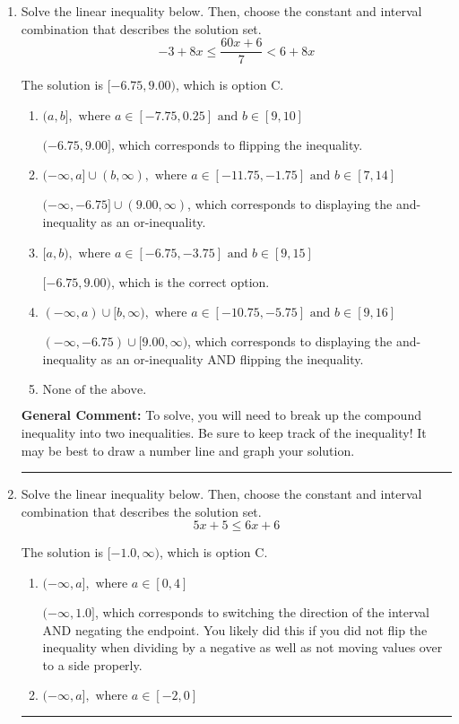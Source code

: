 \documentclass{extbook}[14pt]
\newcommand{\litem}[1]{\item #1

\rule{\textwidth}{0.4pt}}
\begin{document}
\begin{enumerate}\litem{
Solve the linear inequality below. Then, choose the constant and interval combination that describes the solution set.
\[ -3 + 8 x \leq \frac{60 x + 6}{7} < 6 + 8 x \]

The solution is \( [-6.75, 9.00) \), which is option C.\begin{enumerate}[label=\Alph*.]
\item \( (a, b], \text{ where } a \in [-7.75, 0.25] \text{ and } b \in [9, 10] \)

$(-6.75, 9.00]$, which corresponds to flipping the inequality.
\item \( (-\infty, a] \cup (b, \infty), \text{ where } a \in [-11.75, -1.75] \text{ and } b \in [7, 14] \)

$(-\infty, -6.75] \cup (9.00, \infty)$, which corresponds to displaying the and-inequality as an or-inequality.
\item \( [a, b), \text{ where } a \in [-6.75, -3.75] \text{ and } b \in [9, 15] \)

$[-6.75, 9.00)$, which is the correct option.
\item \( (-\infty, a) \cup [b, \infty), \text{ where } a \in [-10.75, -5.75] \text{ and } b \in [9, 16] \)

$(-\infty, -6.75) \cup [9.00, \infty)$, which corresponds to displaying the and-inequality as an or-inequality AND flipping the inequality.
\item \( \text{None of the above.} \)


\end{enumerate}

\textbf{General Comment:} To solve, you will need to break up the compound inequality into two inequalities. Be sure to keep track of the inequality! It may be best to draw a number line and graph your solution.
}
\litem{
Solve the linear inequality below. Then, choose the constant and interval combination that describes the solution set.
\[ 5x + 5 \leq 6x + 6 \]

The solution is \( [-1.0, \infty) \), which is option C.\begin{enumerate}[label=\Alph*.]
\item \( (-\infty, a], \text{ where } a \in [0, 4] \)

 $(-\infty, 1.0]$, which corresponds to switching the direction of the interval AND negating the endpoint. You likely did this if you did not flip the inequality when dividing by a negative as well as not moving values over to a side properly.
\item \( (-\infty, a], \text{ where } a \in [-2, 0] \)


\end{enumerate}}
\end{enumerate}
\end{document}
